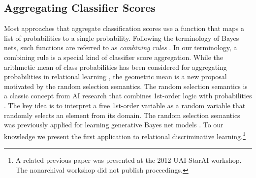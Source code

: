 \documentclass[conference]{IEEEtran}
\begin{document}
\subsection{Aggregating Classifier Scores} Most approaches that aggregate classification scores use a function that maps a list of probabilities to a single probability. Following the terminology of Bayes nets, such functions are referred to as {\em combining rules} \cite{Pearl1988,Kersting2007}. In our terminology, a combining rule is a special kind of classifier score aggregation.
While the arithmetic mean of class probabilities has been considered for aggregating probabilities in relational learning \cite{Natarajan2008}, the geometric mean is a new proposal motivated by the random selection semantics. The random selection semantics is a classic concept from AI research that combines 1st-order logic with probabilities \cite{Halpern90,Bacchus90}. The key idea is to interpret a free 1st-order variable as a random variable that randomly selects an element from its domain. The random selection semantics was previously applied for learning generative Bayes net models \cite{Schulte2011}. To our knowledge we present the first application to relational discriminative learning.\footnote{A related previous paper was presented at the 2012 UAI-StarAI workshop.
 The nonarchival workshop did not publish proceedings.
}
\end{document}
